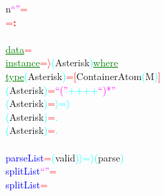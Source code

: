 {\rm{}n}\hsspace \textcolor{magenta}{``''}\hsspace \textcolor{red}{=}\\\hsspace {}\hsspace \textcolor{red}{=}\hsspace \textcolor{red}{{\bf{}:}}\\\\\textcolor{green}{\underline{data}}\hsspace \textcolor{red}{=}\\\textcolor{green}{\underline{instance}}\hsspace \textcolor{red}{=\ensuremath{\rangle}}\hsspace \textcolor{cyan}{(}{\rm{}Asterisk}\textcolor{cyan}{)}\hsspace \textcolor{green}{\underline{where}}\\\hstab \textcolor{green}{\underline{type}}\hsspace \textcolor{cyan}{(}{\rm{}Asterisk}\textcolor{cyan}{)}\hsspace \textcolor{red}{=}\hsspace \textcolor{red}{[}{\rm{}ContainerAtom}\hsspace \textcolor{cyan}{(}{\rm{}M}\textcolor{cyan}{)}\textcolor{red}{]}\\\hsspace \hsspace \textcolor{cyan}{(}{\rm{}Asterisk}\textcolor{cyan}{)}\hsspace \textcolor{red}{=}\hsspace \textcolor{magenta}{``(''}\hsspace \textcolor{cyan}{++}\hsspace \textcolor{cyan}{++}\hsspace \textcolor{magenta}{``)*''}\\\hsspace \textcolor{cyan}{(}{\rm{}Asterisk}\textcolor{cyan}{)}\hsspace \textcolor{red}{=}\hsspace \textcolor{cyan}{\ensuremath{\rangle}=\ensuremath{\rangle}}\\\hsspace \hsspace \hsspace \textcolor{cyan}{(}{\rm{}Asterisk}\textcolor{cyan}{)}\hsspace \textcolor{red}{=}\hsspace \textcolor{cyan}{.}\\\hsspace \hsspace \textcolor{cyan}{(}{\rm{}Asterisk}\textcolor{cyan}{)}\hsspace \textcolor{red}{=}\hsspace \textcolor{cyan}{.}\\\\\textcolor{blue}{parseList}\hsspace \textcolor{red}{=}\hsspace \textcolor{cyan}{(}{\rm{}valid}\textcolor{cyan}{)}\hsspace \textcolor{cyan}{\ensuremath{\rangle}=\ensuremath{\rangle}}\hsspace \textcolor{cyan}{(}{\rm{}parse}\textcolor{cyan}{)}\\\textcolor{blue}{splitList}\hsspace \textcolor{magenta}{``''}\hsspace \textcolor{red}{=}\hsspace {\rm{}[]}\\\textcolor{blue}{splitList}\hsspace \hsspace \textcolor{red}{=}\hsspace 